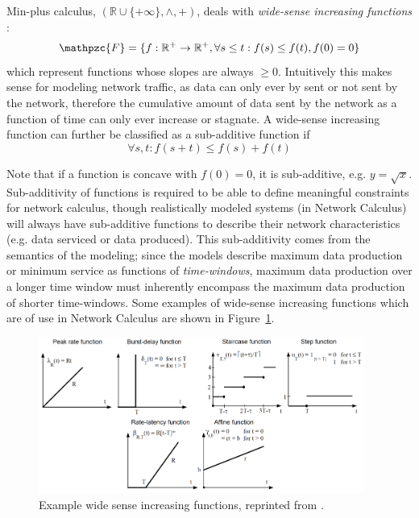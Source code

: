 Min-plus calculus, $(\mathbb{R}\cup\{+\infty\},\wedge,+)$, deals with
\textit{wide-sense increasing functions} :
\begin{equation}
  \mathpzc{F}=\{f : \mathbb{R}^+ \rightarrow \mathbb{R}^+, \forall s
  \leq t : f(s) \leq f(t), f(0) = 0\}
\end{equation}
which represent functions whose slopes are always $\geq 0$.
Intuitively this makes sense for modeling network traffic, as data can
only ever by sent or not sent by the network, therefore the cumulative
amount of data sent by the network as a function of time can only ever
increase or stagnate.  A wide-sense increasing function can further be
classified as a sub-additive function if
\begin{equation}
  \forall s,t : f(s+t) \leq f(s) + f(t)
\end{equation}

Note that if a function is concave with $f(0)=0$, it is sub-additive,
e.g. $y=\sqrt{x}$.  Sub-additivity of functions is required to be able
to define meaningful constraints for network calculus, though
realistically modeled systems (in Network Calculus) will always have
sub-additive functions to describe their network characteristics
(e.g. data serviced or data produced).  This sub-additivity comes from
the semantics of the modeling; since the models describe maximum data
production or minimum service as functions of \emph{time-windows},
maximum data production over a longer time window must inherently
encompass the maximum data production of shorter time-windows.  Some
examples of wide-sense increasing functions which are of use in
Network Calculus are shown in Figure~\ref{fig:wsi}.

\begin{figure}[htb]
  \centering
  \includegraphics[width=0.95\textwidth]{figs/wsi.png}
  \caption{Example wide sense increasing functions, reprinted from \cite{NCBook}.}
  \label{fig:wsi}
\end{figure}

